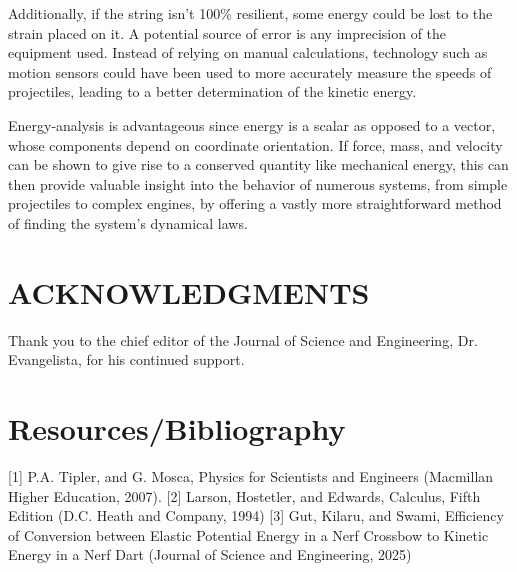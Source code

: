 \documentclass[twocolumn, 10pt]{article}
\begin{document}

Additionally, if the string isn't 100\% resilient, some energy could be lost to the strain placed on it. A potential source of error is any imprecision of the equipment used. Instead of relying on manual calculations, technology such as motion sensors could have been used to more accurately measure the speeds of projectiles, leading to a better determination of the kinetic energy.

Energy-analysis is advantageous since energy is a scalar as opposed to a vector, whose components depend on coordinate orientation. If force, mass, and velocity can be shown to give rise to a conserved quantity like mechanical energy, this can then provide valuable insight into the behavior of numerous systems, from simple projectiles to complex engines, by offering a vastly more straightforward method of finding the system's dynamical laws.
\vspace{-8pt}

\section*{ACKNOWLEDGMENTS} 

Thank you to the chief editor of the Journal of Science and Engineering, Dr. Evangelista, for his continued support.

\section*{Resources/Bibliography}
[1] P.A. Tipler, and G. Mosca, Physics for Scientists and Engineers (Macmillan Higher Education, 2007).
[2] Larson, Hostetler, and Edwards, Calculus, Fifth Edition (D.C. Heath and Company, 1994)
[3] Gut, Kilaru, and Swami, Efficiency of Conversion between Elastic Potential Energy in a Nerf Crossbow to Kinetic Energy in a Nerf Dart (Journal of Science and Engineering, 2025)
\end{document}
